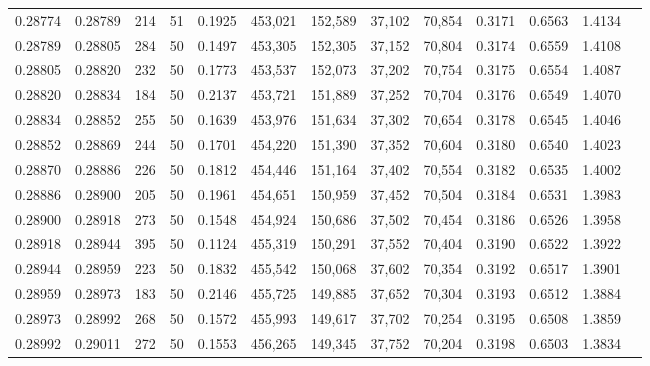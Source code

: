 \begin{tabular}{rrrrrrrrrrrrr}
0.28774 & 0.28789 &   214 &  51 &                                     0.1925 & 453,021 & 152,589 &  37,102 &  70,854 & 0.3171 & 0.6563 & 1.4134 \\
0.28789 & 0.28805 &   284 &  50 &                                     0.1497 & 453,305 & 152,305 &  37,152 &  70,804 & 0.3174 & 0.6559 & 1.4108 \\
0.28805 & 0.28820 &   232 &  50 &                                     0.1773 & 453,537 & 152,073 &  37,202 &  70,754 & 0.3175 & 0.6554 & 1.4087 \\
0.28820 & 0.28834 &   184 &  50 &                                     0.2137 & 453,721 & 151,889 &  37,252 &  70,704 & 0.3176 & 0.6549 & 1.4070 \\
0.28834 & 0.28852 &   255 &  50 &                                     0.1639 & 453,976 & 151,634 &  37,302 &  70,654 & 0.3178 & 0.6545 & 1.4046 \\
0.28852 & 0.28869 &   244 &  50 &                                     0.1701 & 454,220 & 151,390 &  37,352 &  70,604 & 0.3180 & 0.6540 & 1.4023 \\
0.28870 & 0.28886 &   226 &  50 &                                     0.1812 & 454,446 & 151,164 &  37,402 &  70,554 & 0.3182 & 0.6535 & 1.4002 \\
0.28886 & 0.28900 &   205 &  50 &                                     0.1961 & 454,651 & 150,959 &  37,452 &  70,504 & 0.3184 & 0.6531 & 1.3983 \\
0.28900 & 0.28918 &   273 &  50 &                                     0.1548 & 454,924 & 150,686 &  37,502 &  70,454 & 0.3186 & 0.6526 & 1.3958 \\
0.28918 & 0.28944 &   395 &  50 &                                     0.1124 & 455,319 & 150,291 &  37,552 &  70,404 & 0.3190 & 0.6522 & 1.3922 \\
0.28944 & 0.28959 &   223 &  50 &                                     0.1832 & 455,542 & 150,068 &  37,602 &  70,354 & 0.3192 & 0.6517 & 1.3901 \\
0.28959 & 0.28973 &   183 &  50 &                                     0.2146 & 455,725 & 149,885 &  37,652 &  70,304 & 0.3193 & 0.6512 & 1.3884 \\
0.28973 & 0.28992 &   268 &  50 &                                     0.1572 & 455,993 & 149,617 &  37,702 &  70,254 & 0.3195 & 0.6508 & 1.3859 \\
0.28992 & 0.29011 &   272 &  50 &                                     0.1553 & 456,265 & 149,345 &  37,752 &  70,204 & 0.3198 & 0.6503 & 1.3834 \\

\end{tabular}
